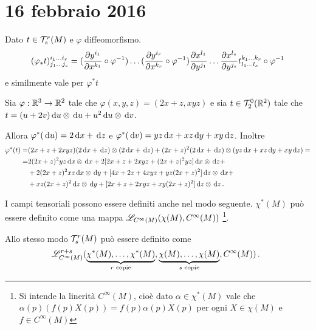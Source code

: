 \chapter{16 febbraio 2016}

Dato $t\in \mathcal T_s^r(M)$ e $\varphi$ diffeomorfismo.
\begin{equation*}
	(\varphi_*t)_{j_1\ldots j_s}^{i_1\ldots i_r} =(\frac{\partial y^{i_1}}{\partial x^{k_1}}\circ \varphi^{-1})\dots (\frac{\partial y^{i_r}}{\partial x^{k_r}} \circ \varphi^{-1}) \frac{\partial x^{l_1}}{\partial y^{j_1}} \dots \frac{\partial x^{l_s}}{\partial y^{j_s}} t_{l_1\ldots l_s}^{k_1\ldots k_r} \circ \varphi^{-1}
\end{equation*}
e similmente vale per $\varphi^*t$



\begin{example}
	Sia $\varphi:\mathbb R^3\to\mathbb R^2$ tale che $\varphi(x,y,z) = (2x+z,xyz)$ e sia $t\in \mathcal T_2^0(\mathbb R^2)$ tale che $t = (u+2v)\,\mathrm d u\otimes \,\mathrm d u + u^2 \,\mathrm d u \otimes \,\mathrm d v$.
	
	Allora $\varphi^*(\,\mathrm d u) = 2\,\mathrm d x +\,\mathrm d z$ e $\varphi^*(\,\mathrm d v) = yz \,\mathrm d x + xz \,\mathrm d y + xy \,\mathrm d z$.
	Inoltre
	\begin{align*}
	\varphi^*(t) =& (2x+z + 2xyz) (2\,\mathrm d x + \,\mathrm d z) \otimes (2\,\mathrm d x + \,\mathrm d z) + (2x+z)^2 (2\,\mathrm d x + \,\mathrm d z) \otimes (yz \,\mathrm d x + xz \,\mathrm d y + xy \,\mathrm d z) = \\
	=&2 (2x+z)^2 yz \,\mathrm d x \otimes \,\mathrm d x +  2 [2x + z + 2xyz + (2x + z)^2 yz] \,\mathrm d x \otimes \,\mathrm d z  +\\
	&+ 2 (2x+z)^2 xz \,\mathrm d x \otimes \,\mathrm d y + [4x + 2z + 4xyz + yz (2x+z)^2] \,\mathrm d z \otimes \,\mathrm d x +  \\
        &+ xz (2x+z)^2 \,\mathrm d z \otimes \,\mathrm d y + [2x + z + 2xyz + xy (2x+z)^2] \,\mathrm d z \otimes \,\mathrm d z \, \text{. }
	\end{align*}
\end{example}

\begin{remark}
	I campi tensoriali possono essere definiti anche nel modo seguente.
	$\chi^*(M)$ può essere definito come una mappa $\mathscr L_{C^\infty(M)} (\chi(M), C^\infty(M))$ \footnote{Si intende la linerità $C^\infty(M)$, cioè dato $\alpha\in\chi^*(M)$ vale che $\alpha(p)(f(p)X(p)) = f(p) \alpha(p) X(p)$ per ogni $X\in\chi(M)$ e $f\in C^\infty(M)$}.
	
	Allo stesso modo $\mathcal T_s^r(M)$ può essere definito come
	\begin{equation*}
	\mathscr L_{C^\infty(M)}^{r+s}(\underbrace{\chi^*(M),\ldots,\chi^*(M)}_{\text{$r$ copie}},\underbrace{\chi(M),\ldots,\chi(M)}_{\text{$s$ copie}},C^\infty(M))\, \text{. }
	\end{equation*}
\end{remark}

